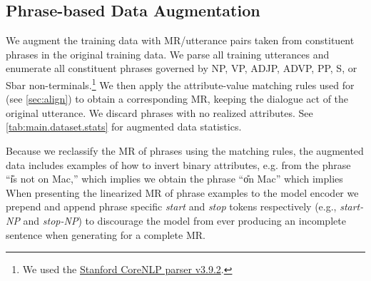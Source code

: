 \subsection{Phrase-based Data Augmentation}
\label{sec:dataaug}

We augment the training data with MR/utterance pairs taken from constituent
phrases in the original training data.  We parse all training utterances and
enumerate all constituent phrases governed by NP, VP, ADJP, ADVP, PP, S, 
or Sbar
non-terminals.\footnote{We used the
\href{https://stanfordnlp.github.io/CoreNLP/}{Stanford CoreNLP parser
v3.9.2}.} We then apply the attribute-value matching rules used for
 (see \autoref{sec:align}) to obtain a corresponding MR, keeping
the dialogue act of the original utterance. We discard phrases with no realized
attributes.  See \autoref{tab:main.dataset.stats} for augmented data
statistics.

Because we reclassify the MR of phrases using the matching rules, the
augmented  data includes examples of how to invert binary attributes, e.g.
from the phrase ``\U{is not on Mac,}'' which implies
 we obtain the phrase ``\U{on Mac}''
which implies  When presenting the linearized
MR of phrase examples to the model encoder we prepend and append phrase
specific \textit{start} and \textit{stop} tokens respectively (e.g.,
\textit{start-NP} and \textit{stop-NP}) to discourage the model from ever
producing an incomplete sentence when generating for a complete MR.
